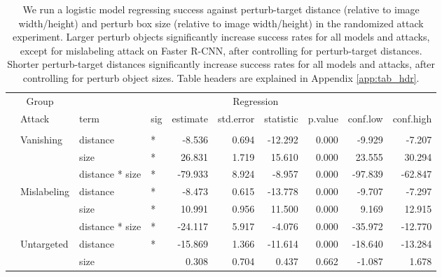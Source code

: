 \begin{longtable}[t]{llllrrrrrr}
\caption{\label{tab:perturb_bbox_and_object_dist_table}We run a logistic model regressing success against perturb-target distance (relative to image width/height) and perturb box size (relative to image width/height) in the randomized attack experiment. Larger perturb objects significantly increase success rates for all models and attacks, except for mislabeling attack on Faster R-CNN, after controlling for perturb-target distances. Shorter perturb-target distances significantly increase success rates for all models and attacks, after controlling for perturb object sizes. Table headers are explained in Appendix \ref{app:tab_hdr}.}\\
\toprule
\multicolumn{2}{c}{Group} & \multicolumn{8}{c}{Regression} \\
\cmidrule(l{3pt}r{3pt}){1-2} \cmidrule(l{3pt}r{3pt}){3-10}
 & Attack & term & sig & estimate & std.error & statistic & p.value & conf.low & conf.high\\
\midrule
\addlinespace[0.3em]
\multicolumn{10}{l}{\textbf{YOLOv3}}\\
\hspace{1em} & Vanishing & distance & * & -8.536 & 0.694 & -12.292 & 0.000 & -9.929 & -7.207\\
\cmidrule{3-10}\nopagebreak
\hspace{1em} &  & size & * & 26.831 & 1.719 & 15.610 & 0.000 & 23.555 & 30.294\\
\cmidrule{3-10}\nopagebreak
\hspace{1em} &  & distance * size & * & -79.933 & 8.924 & -8.957 & 0.000 & -97.839 & -62.847\\
\cmidrule{2-10}\nopagebreak
\hspace{1em} & Mislabeling & distance & * & -8.473 & 0.615 & -13.778 & 0.000 & -9.707 & -7.297\\
\cmidrule{3-10}\nopagebreak
\hspace{1em} &  & size & * & 10.991 & 0.956 & 11.500 & 0.000 & 9.169 & 12.915\\
\cmidrule{3-10}\nopagebreak
\hspace{1em} &  & distance * size & * & -24.117 & 5.917 & -4.076 & 0.000 & -35.972 & -12.770\\
\cmidrule{2-10}\nopagebreak
\hspace{1em} & Untargeted & distance & * & -15.869 & 1.366 & -11.614 & 0.000 & -18.640 & -13.284\\
\cmidrule{3-10}\nopagebreak
\hspace{1em} &  & size &  & 0.308 & 0.704 & 0.437 & 0.662 & -1.087 & 1.678\\

\end{longtable}
